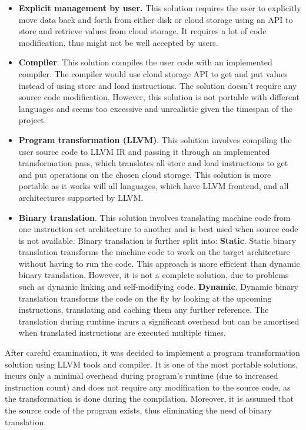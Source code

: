 \documentclass[bsc,frontabs,twoside,singlespacing,parskip,deptreport]{infthesis}     %
\begin{document}
\begin{itemize}
\item
\textbf{Explicit management by user.} This solution requires the user to explicitly move data back and forth from either disk or cloud storage using an API to store and retrieve values from cloud storage. It requires a lot of code modification, thus might not be well accepted by users.
\item
\textbf{Compiler}. This solution compiles the user code with an implemented compiler. The compiler would use cloud storage API to get and put values instead of using store and load instructions. The solution doesn't require any source code modification. However, this solution is not portable with different languages and seems too excessive and unrealistic given the timespan of the project.
\item
\textbf{Program transformation (LLVM)}. This solution involves compiling the user source code to LLVM IR and passing it through an implemented transformation pass, which translates all store and load instructions to get and put operations on the chosen cloud storage. This solution is more portable as it works will all languages, which have LLVM frontend, and all architectures supported by LLVM.
\item
\textbf{Binary translation}. This solution involves translating machine code from one instruction set architecture to another and is best used when source code is not available. Binary translation is further split into:
\subitem
\textbf{Static}. Static binary translation transforms the machine code to work on the target architecture without having to run the code. This approach is more efficient than dynamic binary translation. However, it is not a complete solution, due to problems such as dynamic linking and self-modifying code.
\subitem
\textbf{Dynamic}. Dynamic binary translation transforms the code on the fly by looking at the upcoming instructions, translating and caching them any further reference. The translation during runtime incurs a significant overhead but can be amortised when translated instructions are executed multiple times.
\end{itemize}

After careful examination, it was decided to implement a program transformation solution using LLVM tools and compiler. It is one of the most portable solutions, incurs only a minimal overhead during program's runtime (due to increased instruction count) and does not require any modification to the source code, as the transformation is done during the compilation. Moreover, it is assumed that the source code of the program exists, thus eliminating the need of binary translation.
\end{document}

